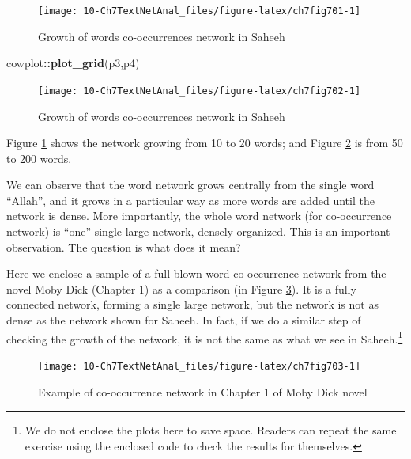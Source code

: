 \documentclass[
]{article}
\newenvironment{Shaded}{\begin{snugshade}}{\end{snugshade}}
\newcommand{\FunctionTok}[1]{\textcolor[rgb]{0.13,0.29,0.53}{\textbf{#1}}}
\newcommand{\NormalTok}[1]{#1}
\newcommand{\SpecialCharTok}[1]{\textcolor[rgb]{0.81,0.36,0.00}{\textbf{#1}}}
\begin{document}
\begin{figure}

{\centering \texttt{[image: 10-Ch7TextNetAnal\_files/figure-latex/ch7fig701-1]} 

}

\caption{Growth of words co-occurrences network in Saheeh}\label{fig:ch7fig701}
\end{figure}

\begin{Shaded}
\begin{Highlighting}[]
\NormalTok{cowplot}\SpecialCharTok{::}\FunctionTok{plot\_grid}\NormalTok{(p3,p4)}
\end{Highlighting}
\end{Shaded}

\begin{figure}

{\centering \texttt{[image: 10-Ch7TextNetAnal\_files/figure-latex/ch7fig702-1]} 

}

\caption{Growth of words co-occurrences network in Saheeh}\label{fig:ch7fig702}
\end{figure}

Figure \ref{fig:ch7fig701} shows the network growing from 10 to 20 words; and Figure \ref{fig:ch7fig702} is from 50 to 200 words.

We can observe that the word network grows centrally from the single word ``Allah'', and it grows in a particular way as more words are added until the network is dense. More importantly, the whole word network (for co-occurrence network) is ``one'' single large network, densely organized. This is an important observation. The question is what does it mean?

Here we enclose a sample of a full-blown word co-occurrence network from the novel Moby Dick (Chapter 1) as a comparison (in Figure \ref{fig:ch7fig703}). It is a fully connected network, forming a single large network, but the network is not as dense as the network shown for Saheeh. In fact, if we do a similar step of checking the growth of the network, it is not the same as what we see in Saheeh.\footnote{We do not enclose the plots here to save space. Readers can repeat the same exercise using the enclosed code to check the results for themselves.}

\begin{figure}

{\centering \texttt{[image: 10-Ch7TextNetAnal\_files/figure-latex/ch7fig703-1]} 

}

\caption{Example of co-occurrence network in Chapter 1 of Moby Dick novel}\label{fig:ch7fig703}
\end{figure}
\end{document}
